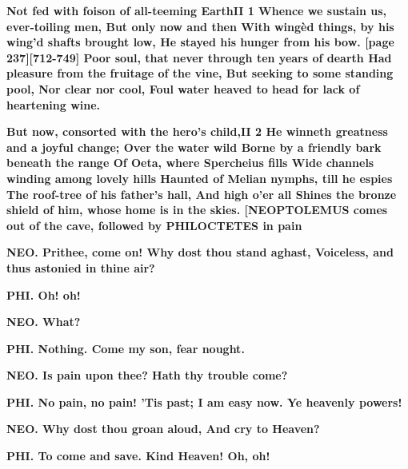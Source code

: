\documentclass[11pt,letter]{book}
\begin{document}
\par \textbf{Not fed with foison of all-teeming EarthII 1 Whence we sustain us, ever-toiling men, But only now and then With wingèd things, by his wing’d shafts brought low, He stayed his hunger from his bow. [page 237][712-749] Poor soul, that never through ten years of dearth Had pleasure from the fruitage of the vine, But seeking to some standing pool, Nor clear nor cool, Foul water heaved to head for lack of heartening wine.}
\par 

\par \textbf{But now, consorted with the hero’s child,II 2 He winneth greatness and a joyful change; Over the water wild Borne by a friendly bark beneath the range Of Oeta, where Spercheius fills Wide channels winding among lovely hills Haunted of Melian nymphs, till he espies The roof-tree of his father’s hall, And high o’er all Shines the bronze shield of him, whose home is in the skies. [NEOPTOLEMUS comes out of the cave, followed by PHILOCTETES in pain}
\par 

\par \textbf{NEO. Prithee, come on! Why dost thou stand aghast, Voiceless, and thus astonied in thine air?}
\par 

\par \textbf{PHI. Oh! oh!}
\par 

\par \textbf{NEO. What?}
\par 

\par \textbf{PHI. Nothing. Come my son, fear nought.}
\par 

\par \textbf{NEO. Is pain upon thee? Hath thy trouble come?}
\par 

\par \textbf{PHI. No pain, no pain! ’Tis past; I am easy now. Ye heavenly powers!}
\par 

\par \textbf{NEO. Why dost thou groan aloud, And cry to Heaven?}
\par 

\par \textbf{PHI. To come and save. Kind Heaven! Oh, oh!}
\par 
\end{document}
